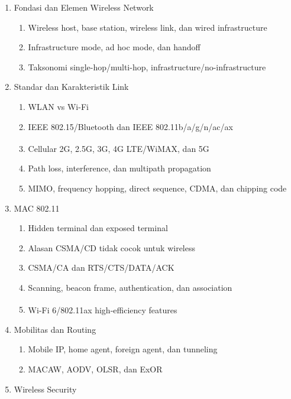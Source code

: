 \begin{enumerate}
    \item \pwajib Fondasi dan Elemen Wireless Network
    \begin{enumerate}
        \item \pwajib Wireless host, base station, wireless link, dan wired infrastructure
        \item \pwajib Infrastructure mode, ad hoc mode, dan handoff
        \item \pwajib Taksonomi single-hop/multi-hop, infrastructure/no-infrastructure
    \end{enumerate}
    \item \pwajib Standar dan Karakteristik Link
    \begin{enumerate}
        \item \pwajib WLAN vs Wi-Fi
        \item \ppaham IEEE 802.15/Bluetooth dan IEEE 802.11b/a/g/n/ac/ax
        \item \ppaham Cellular 2G, 2.5G, 3G, 4G LTE/WiMAX, dan 5G\textsuperscript{\dag}
        \item \pwajib Path loss, interference, dan multipath propagation
        \item \ppaham MIMO, frequency hopping, direct sequence, CDMA, dan chipping code
    \end{enumerate}
    \item \pwajib MAC 802.11
    \begin{enumerate}
        \item \pwajib Hidden terminal dan exposed terminal
        \item \pwajib Alasan CSMA/CD tidak cocok untuk wireless
        \item \pwajib CSMA/CA dan RTS/CTS/DATA/ACK
        \item \pwajib Scanning, beacon frame, authentication, dan association
        \item \ppaham Wi-Fi 6/802.11ax high-efficiency features\textsuperscript{\dag}
    \end{enumerate}
    \item \ppaham Mobilitas dan Routing
    \begin{enumerate}
        \item \ppaham Mobile IP, home agent, foreign agent, dan tunneling
        \item \ppaham MACAW, AODV, OLSR, dan ExOR
    \end{enumerate}
    \item \pwajib Wireless Security

\end{enumerate}
